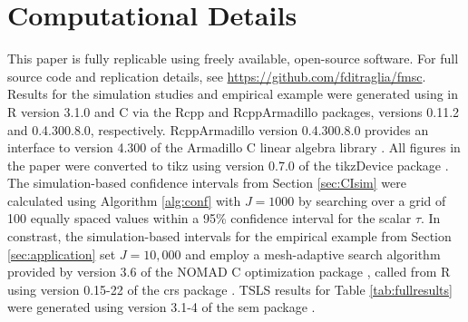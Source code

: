 \section{Computational Details}
\label{append:comp}
This paper is fully replicable using freely available, open-source software.
For full source code and replication details, see \url{https://github.com/fditraglia/fmsc}.
Results for the simulation studies and empirical example were generated using in R version 3.1.0 \citep{R} and C\raisebox{0.5ex}{\tiny\textbf{++}} via the Rcpp \citep{RcppArticle,RcppBook} and RcppArmadillo \citep{RcppArmadillo} packages, versions 0.11.2 and 0.4.300.8.0, respectively.
RcppArmadillo version 0.4.300.8.0 provides an interface to version 4.300 of the Armadillo C\raisebox{0.5ex}{\tiny\textbf{++}} linear algebra library \citep{Armadillo}.
All figures in the paper were converted to tikz using version 0.7.0 of the tikzDevice package \citep{tikzDevice}.
The simulation-based confidence intervals from Section \ref{sec:CIsim} were calculated using Algorithm \ref{alg:conf} with $J = 1000$ by searching over a grid of 100 equally spaced values within a 95\% confidence interval for the scalar $\tau$.
In constrast, the simulation-based intervals for the empirical example from Section \ref{sec:application} set $J = 10,000$ and employ a mesh-adaptive search algorithm provided by version 3.6 of the NOMAD C\raisebox{0.5ex}{\tiny\textbf{++}} optimization package \citep{NOMADalgorithm,NOMADcode,NOMADuserguide}, called from R using version 0.15-22 of the crs package \citep{crs}.
TSLS results for Table \ref{tab:fullresults} were generated using version 3.1-4 of the sem package \citep{sem}.